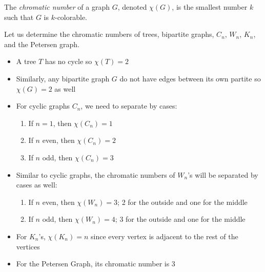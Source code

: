 \begin{definition}
  The \textit{chromatic number} of a graph \(G\), denoted
  \(\chi(G)\), is the smallest number \(k\) such that \(G\) is
  \(k\)-colorable.
\end{definition}

\begin{nexample}
  Let us determine the chromatic numbers of trees, bipartite
  graphs, \(C_n\), \(W_n\), \(K_n\), and the Petersen graph.
  \begin{itemize}
    \item A tree \(T\) has no cycle so \(\chi(T) = 2\) 
    \item Similarly, any bipartite graph \(G\) do not have edges
      between its own partite so \(\chi(G) = 2\) as well
    \item For cyclic graphs \(C_n\), we need to separate by
      cases:
      \begin{enumerate}[label=\Roman*.]
        \item If \(n=1\), then \(\chi(C_n)=1\)
        \item If \(n\) even, then \(\chi(C_n) = 2\)
        \item If \(n\) odd, then \(\chi(C_n) = 3\)
      \end{enumerate}
    \item Similar to cyclic graphs, the chromatic numbers of 
      \(W_n\)'s will be separated by cases as well:
      \begin{enumerate}[label=\Roman*.]
        \item If \(n\) even, then \(\chi(W_n) = 3\); 2 for the
          outside and one for the middle
        \item If \(n\) odd, then \(\chi(W_n) = 4\); 3 for the
          outside and one for the middle
      \end{enumerate}
    \item For \(K_n\)'s, \(\chi(K_n) = n\) since every vertex is
      adjacent to the rest of the vertices
    \item For the Petersen Graph, its chromatic number is 3
  \end{itemize}
\end{nexample}
